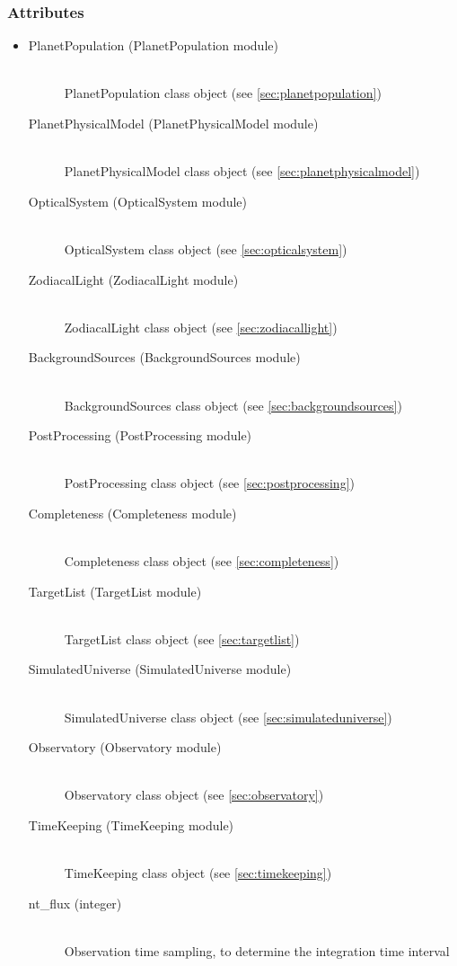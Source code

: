 \documentclass[cleanfoot]{asme2ej}
\begin{document}
\subsubsection*{Attributes}
\begin{itemize}
\item
\begin{description}
    \item[PlanetPopulation (PlanetPopulation module)] \hfill \\ PlanetPopulation class object (see \ref{sec:planetpopulation})
    \item[PlanetPhysicalModel (PlanetPhysicalModel module)] \hfill \\ PlanetPhysicalModel class object (see \ref{sec:planetphysicalmodel})
    \item[OpticalSystem (OpticalSystem module)] \hfill \\ OpticalSystem class object (see \ref{sec:opticalsystem})
    \item[ZodiacalLight (ZodiacalLight module)] \hfill \\ ZodiacalLight class object (see \ref{sec:zodiacallight})
    \item[BackgroundSources (BackgroundSources module)] \hfill \\ BackgroundSources class object (see \ref{sec:backgroundsources})
    \item[PostProcessing (PostProcessing module)] \hfill \\ PostProcessing class object (see \ref{sec:postprocessing})
    \item[Completeness (Completeness module)] \hfill \\ Completeness class object (see \ref{sec:completeness})
    \item[TargetList (TargetList module)] \hfill \\ TargetList class object (see \ref{sec:targetlist})
    \item[SimulatedUniverse (SimulatedUniverse module)] \hfill \\ SimulatedUniverse class object (see \ref{sec:simulateduniverse})
    \item[Observatory (Observatory module)] \hfill \\ Observatory class object (see \ref{sec:observatory})
    \item[TimeKeeping (TimeKeeping module)] \hfill \\ TimeKeeping class object (see \ref{sec:timekeeping})
    \item[nt\_flux (integer)] \hfill \\ Observation time sampling, to determine the integration time interval

\end{description}
\end{itemize}
\end{document}
